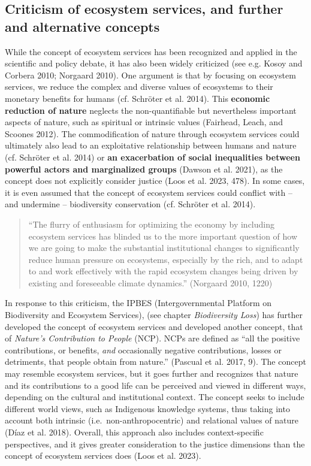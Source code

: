 \documentclass[
  a4paper,
  openany]{book}
\begin{document}
\subsection{Criticism of ecosystem services, and further and alternative
concepts}\label{criticism-of-ecosystem-services-and-further-and-alternative-concepts}

While the concept of ecosystem services has been recognized and applied
in the scientific and policy debate, it has also been widely criticized
(see e.g. Kosoy and Corbera 2010; Norgaard 2010). One argument is that
by focusing on ecosystem services, we reduce the complex and diverse
values of ecosystems to their monetary benefits for humans (cf. Schröter
et al. 2014). This \textbf{economic reduction of nature} neglects the
non-quantifiable but nevertheless important aspects of nature, such as
spiritual or intrinsic values (Fairhead, Leach, and Scoones 2012). The
commodification of nature through ecosystem services could ultimately
also lead to an exploitative relationship between humans and nature (cf.
Schröter et al. 2014) or \textbf{an exacerbation of social inequalities
between powerful actors and marginalized groups} (Dawson et al. 2021),
as the concept does not explicitly consider justice (Loos et al. 2023,
478). In some cases, it is even assumed that the concept of ecosystem
services could conflict with -- and undermine -- biodiversity
conservation (cf. Schröter et al. 2014).

\begin{quote}
``The flurry of enthusiasm for optimizing the economy by including
ecosystem services has blinded us to the more important question of how
we are going to make the substantial institutional changes to
significantly reduce human pressure on ecosystems, especially by the
rich, and to adapt to and work effectively with the rapid ecosystem
changes being driven by existing and foreseeable climate dynamics.''
(Norgaard 2010, 1220)
\end{quote}

In response to this criticism, the IPBES (Intergovernmental Platform on
Biodiversity and Ecosystem Services), (see chapter \emph{Biodiversity
Loss}) has further developed the concept of ecosystem services and
developed another concept, that of \emph{Nature's Contribution to
People} (NCP). NCPs are defined as ``all the positive contributions, or
benefits, \emph{and} occasionally negative contributions, losses or
detriments, that people obtain from nature.'' (Pascual et al. 2017, 9).
The concept may resemble ecosystem services, but it goes further and
recognizes that nature and its contributions to a good life can be
perceived and viewed in different ways, depending on the cultural and
institutional context. The concept seeks to include different world
views, such as Indigenous knowledge systems, thus taking into account
both intrinsic (i.e.~non-anthropocentric) and relational values of
nature (Díaz et al. 2018). Overall, this approach also includes
context-specific perspectives, and it gives greater consideration to the
justice dimensions than the concept of ecosystem services does (Loos et
al. 2023).
\end{document}
